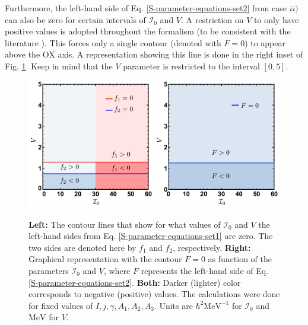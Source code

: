 Furthermore, the left-hand side of Eq. \ref{S-parameter-equations-set2} from case $ii)$ can also be zero for certain intervals of $\mathcal{I}_0$ and $V$. A restriction on $V$ to only have positive values is adopted throughout the formalism (to be consistent with the literature \cite{shou2009coupling,tanabe2017stability,poenaru2021parity}). This forces only a single contour (denoted with $F=0$) to appear above the OX axis. A representation showing this line is done in the right inset of Fig. \ref{fig-vanishing-f1-f2-F}. Keep in mind that the $V$ parameter is restricted to the interval $[0,5]$.
\begin{figure}
    \centering
    \includegraphics[width=0.49\textwidth]{Chapters/Figures/f1f2_solutions-edited.pdf}
    \includegraphics[width=0.49\textwidth]{Chapters/Figures/F_solutions_B-term.pdf}
    \caption{\textbf{Left:} The contour lines that show for what values of $\mathcal{I}_0$ and $V$ the left-hand sides from Eq. \ref{S-parameter-equations-set1} are zero. The two sides are denoted here by $f_1$ and $f_2$, respectively. \textbf{Right:} Graphical representation with the contour $F=0$ as function of the parameters $\mathcal{I}_0$ and $V$, where $F$ represents the left-hand side of Eq. \ref{S-parameter-equations-set2}. \textbf{Both:} Darker (lighter) color corresponds to negative (positive) values. The calculations were done for fixed values of $I, j, \gamma, A_1, A_2, A_3$. Units are $\hbar^2\text{MeV}^{-1}$ for $\mathcal{I}_0$ and $\text{MeV}$ for $V$.}
    \label{fig-vanishing-f1-f2-F}
\end{figure}

